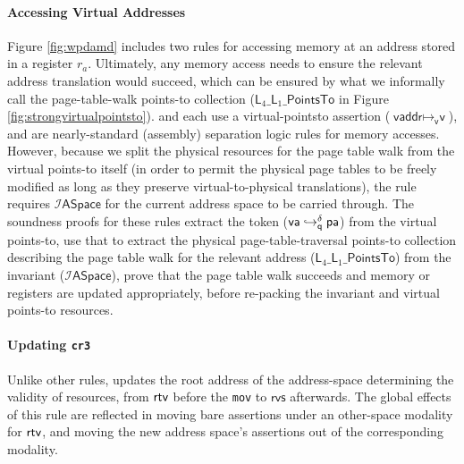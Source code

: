 \paragraph{Accessing Virtual Addresses}
Figure \ref{fig:wpdamd} includes two  rules for accessing memory at an address stored in a register $r_a$. 
Ultimately, any memory access needs to ensure the relevant address translation would succeed,
which can be ensured by what we informally call the page-table-walk points-to collection
($\textsf{L}_{4}\_\textsf{L}_{1}\_\textsf{PointsTo}$ in Figure \ref{fig:strongvirtualpointsto}).
 and 
each use a virtual-pointsto assertion ($\textsf{vaddr} \mapsto_{\textsf{v}} \textsf{v}$),
and are nearly-standard (assembly) separation logic rules for memory accesses.
However, because we split the physical resources for the page table walk from the
virtual points-to itself (in order to permit the physical page tables to be freely modified
as long as they preserve virtual-to-physical translations), the rule requires $\mathcal{I}\textsf{ASpace}$
for the current address space to be carried through.
The soundness proofs for these rules extract
the token ($\mathsf{va}\hookrightarrow^{\delta}_{\mathsf{q}}\textsf{pa}$) from the virtual points-to,
use that to extract the physical page-table-traversal points-to collection describing
the page table walk for the relevant address ($\textsf{L}_{4}\_\textsf{L}_{1}\_\textsf{PointsTo}$)
from the invariant ($\mathcal{I}\mathsf{ASpace}$), prove that the page table walk succeeds and
memory or registers are updated appropriately, before re-packing the invariant and virtual points-to resources.

\paragraph{Updating \lstinline|cr3|} 
Unlike other rules,  updates the root address of the 
address-space determining the validity of resources, from $\textsf{rtv}$ before the
\lstinline|mov| to $\textsf{rvs}$ afterwards. The global effects of this rule are reflected in moving
bare assertions under an other-space modality for $\textsf{rtv}$, and moving the new address space's assertions out of
the corresponding modality.

